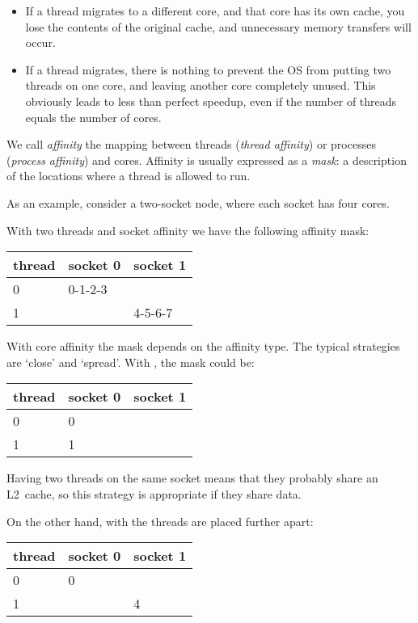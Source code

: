 \begin{itemize}
\item If a thread migrates to a different core, and that core has its
  own cache, you lose the contents of the original cache, and
  unnecessary memory transfers will occur.
\item If a thread migrates, there is nothing to prevent the OS from
  putting two threads on one core, and leaving another core completely
  unused. This obviously leads to less than perfect speedup, even if
  the number of threads equals the number of cores.
\end{itemize}

We call \emph{affinity} the mapping between
threads (\emph{thread affinity})
or processes (\emph{process
  affinity}) and cores.
Affinity is usually expressed as a \emph{mask}: a
description of the locations where a thread is allowed to run.

As an example, consider a two-socket node, where each socket has four
cores.

With two threads and socket affinity we have the following affinity mask:\\
\begin{tabular}{lll}
  \toprule
  thread & socket 0 & socket 1\\
  \midrule
  0 & 0-1-2-3 & \\
  1 & & 4-5-6-7 \\
  \bottomrule
\end{tabular}

With core affinity the mask depends on the affinity type. The typical
strategies are `close' and `spread'. With , the mask
could be:\\
\begin{tabular}{lll}
  \toprule
  thread & socket 0 & socket 1\\
  \midrule
  0 & 0 & \\
  1 & \hphantom{0-}1 & \\
  \bottomrule
\end{tabular}

Having two threads on the same socket means that they probably share
an L2~cache, so this strategy is appropriate if they share data.

On the other hand, with  the threads
are placed further apart:\\
\begin{tabular}{lll}
  \toprule
  thread & socket 0 & socket 1\\
  \midrule
  0 & 0 & \\
  1 & & 4 \\
  \bottomrule
\end{tabular}

